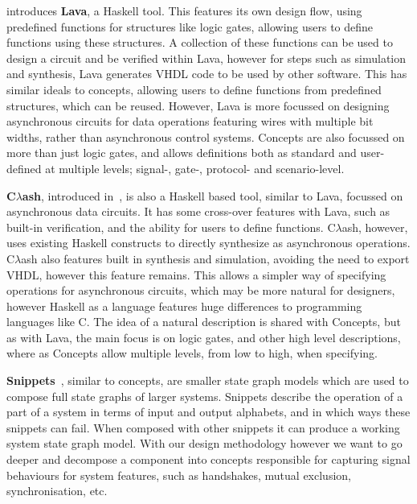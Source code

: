 \documentclass[british,compsoc]{IEEEtran}
\newcommand{\noun}[1]{\textsc{#1}}
\begin{document}
\cite{bjesse1998lava} introduces \textbf{Lava}, a Haskell tool. This features its own design flow, using predefined functions for structures like logic gates, allowing users to define
functions using these structures. A collection of these functions can be used to design a circuit and be verified within Lava, however for steps such as simulation and synthesis, Lava
generates VHDL code to be used by other software. This has similar ideals to concepts, allowing users to define functions from predefined structures, which can be reused. However,
Lava is more focussed on designing asynchronous circuits for data operations featuring wires with multiple bit widths, rather than asynchronous control systems. Concepts are also
focussed on more than just logic gates, and allows definitions both as standard and user-defined at multiple levels; signal-, gate-, protocol- and scenario-level.

\textbf{C$\lambda$ash}, introduced in~\cite{baaij2009clambdaash},  is also a Haskell based tool, similar to Lava, focussed on asynchronous data circuits.  It has some cross-over
features with Lava, such as built-in verification, and the ability for users to define functions. C$\lambda$ash, however, uses existing Haskell constructs to directly synthesize as
asynchronous operations. C$\lambda$ash also features built in synthesis and simulation, avoiding the need to export VHDL, however this feature remains. This allows a simpler way of
specifying operations for asynchronous circuits, which may be more natural for designers, however Haskell as a language features huge differences to programming languages like
\noun{C}. The idea of a natural description is shared with Concepts, but as with Lava, the main focus is on logic gates, and other high level descriptions, where as Concepts allow
multiple levels, from low to high, when specifying.

\textbf{Snippets}~\cite{raey}, similar to concepts, are smaller
state graph models which are used to compose full state graphs of
larger systems. Snippets describe the operation of a part of a system
in terms of input and output alphabets, and in which ways these snippets
can fail. When composed with other snippets it can produce a working
system state graph model. With our design methodology however we want
to go deeper and decompose a component into concepts responsible for
capturing signal behaviours for system features, such as handshakes,
mutual exclusion, synchronisation, etc.
\end{document}
